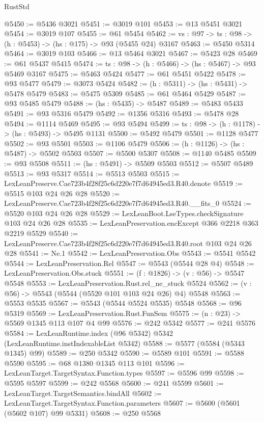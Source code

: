 \begin{lexlean}{RustStd}
\begin{coremodule}
@5450 := @5436 @3021
@5451 := @3019 @101
@5453 := @13 @5451 @3021
@5454 := @3019 @107
@5455 := @61 @5454
@5462 := {vs : @97} -> {ts : @98} -> (h : @5453) -> (hs : @175) -> @93 (@5455 @24) @3167
@5463 := @5450 @5314
@5464 := @3019 @103
@5466 := @13 @5464 @3021
@5467 := @5423 @28
@5469 := @61 @5437 @5415
@5474 := {ts : @98} -> (h : @5466) -> (hs : @5467) -> @93 @5469 @3167
@5475 := @5463 @5424
@5477 := @61 @5451 @5422
@5478 := @93 @5477
@5479 := @3073 @5424
@5482 := (h : @5311) -> (hs : @5431) -> @5478 @5479
@5483 := @5475 @5309
@5485 := @61 @5464 @5429
@5487 := @93 @5485 @5479
@5488 := (hs : @5435) -> @5487
@5489 := @5483 @5433
@5491 := @93 @5316 @5479
@5492 := @1356 @5316
@5493 := @5478 @28
@5494 := @1114 @5469
@5495 := @93 @5494
@5499 := {ts : @98} -> (h : @1178) -> (hs : @5493) -> @5495 @1131
@5500 := @5492 @5479
@5501 := @1128 @5477
@5502 := @93 @5501
@5503 := @1106 @5479
@5506 := (h : @1126) -> (hs : @5487) -> @5502 @5503
@5507 := @5500 @5307
@5508 := @1140 @5485
@5509 := @93 @5508
@5511 := (hs : @5491) -> @5509 @5503
@5512 := @5507 @5489
@5513 := @93 @5317
@5514 := @5513 @5503
@5515 := LexLeanPreserve.Cae723b4f28f25c6d220e7f7d64945ed3.R40.denote
@5519 := @5515 @103 @24 @26 @28
@5520 := LexLeanPreserve.Cae723b4f28f25c6d220e7f7d64945ed3.R40.__fits_0
@5524 := @5520 @103 @24 @26 @28
@5529 := LexLeanBoot.LseTypes.checkSignature @103 @24 @26 @28
@5535 := LexLeanPreservation.encExcept @366 @2218 @363 @2219 @5529
@5540 := LexLeanPreserve.Cae723b4f28f25c6d220e7f7d64945ed3.R40.root @103 @24 @26 @28
@5541 := Ne.{1}
@5542 := LexLeanPreservation.Obs
@5543 := @5541 @5542
@5544 := LexLeanPreservation.Rel
@5547 := @5543 (@5544 @28 @4)
@5548 := LexLeanPreservation.Obs.stuck
@5551 := (f : @1826) -> (v : @56) -> @5547 @5548
@5553 := LexLeanPreservation.Rust.rel_ne_stuck @5524
@5562 := (v : @56) -> @5543 (@5544 (@5520 @101 @103 @24 @26) @4) @5548
@5563 := @5553 @5535
@5567 := @5543 (@5544 @5524 @5535) @5548
@5568 := @96 @5319
@5569 := LexLeanPreservation.Rust.FunSem
@5575 := (n : @23) -> @5569 @1345 @113 @107 @4 @99
@5576 := @242 @5342
@5577 := @241 @5576
@5584 := LexLeanRuntime.index (@96 @5342) @5342 (LexLeanRuntime.instIndexableList @5342)
@5588 := @5577 (@5584 (@5343 @1345) @99)
@5589 := @250 @5342
@5590 := @5589 @101
@5591 := @5588 @5590
@5595 := @68 @1380 @1345 @113 @101
@5596 := LexLeanTarget.TargetSyntax.Function.types
@5597 := @5596 @99
@5598 := @5595 @5597
@5599 := @242 @5568
@5600 := @241 @5599
@5601 := LexLeanTarget.TargetSemantics.bindAll
@5602 := LexLeanTarget.TargetSyntax.Function.parameters
@5607 := @5600 (@5601 (@5602 @107) @99 @5331)
@5608 := @250 @5568

\end{coremodule}
\end{lexlean}
